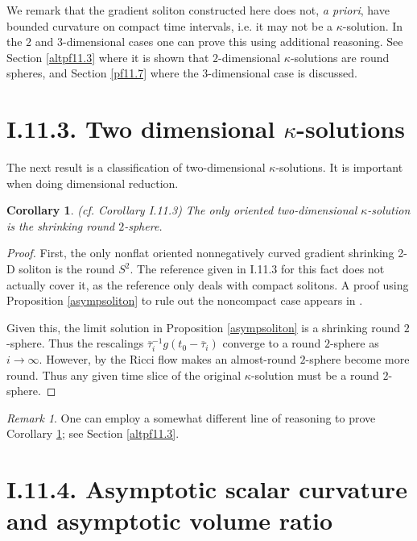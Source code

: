 \documentclass[12pt]{amsart}
\numberwithin{equation}{section}
\theoremstyle{plain}
\newtheorem{corollary}[equation]{Corollary}
\theoremstyle{definition}
\theoremstyle{remark}
\newtheorem{remark}[equation]{Remark}
\begin{document}
We remark that the gradient soliton constructed here does
not, {\it a priori}, have bounded curvature on 
compact time intervals,
i.e.
it may not be a $\kappa$-solution.  In the $2$ and
$3$-dimensional cases
one can prove this using additional
reasoning.  See Section \ref{altpf11.3} where
it is shown that $2$-dimensional $\kappa$-solutions are
round spheres, and Section \ref{pf11.7} where the $3$-dimensional
case is discussed. 


\section{I.11.3. Two dimensional $\kappa$-solutions} \label{I.11.3}

The next result is a classification of two-dimensional
$\kappa$-solutions.  It is important when doing dimensional
reduction.

\begin{corollary} (cf. Corollary I.11.3) \label{2Dsoliton}
The only oriented two-dimensional $\kappa$-solution is
the shrinking round $2$-sphere.
\end{corollary}
\begin{proof}
First, the
only nonflat oriented 
nonnegatively curved gradient shrinking 2-D soliton is the
round $S^2$. The reference \cite{Hamsurface} given in I.11.3 for this
fact does not actually cover it, as the reference
only deals with compact solitons. A proof using 
Proposition \ref{asympsoliton} to rule
out the noncompact case appears in \cite{Ye2}.

Given this, the limit solution in Proposition \ref{asympsoliton}
is a shrinking round $2$-sphere.  Thus the rescalings 
$\overline{\tau}_i^{-1} g(t_0 - \overline{\tau}_i)$ converge to
a round $2$-sphere as $i \rightarrow \infty$.  However, by \cite{Hamsurface}
the Ricci flow makes an
almost-round $2$-sphere become more round. Thus any given time slice
of the original $\kappa$-solution must be a round $2$-sphere. 
\end{proof}

\begin{remark}
One can employ a somewhat different
line of reasoning to prove Corollary \ref{2Dsoliton}; see Section
\ref{altpf11.3}.
\end{remark}

\section{I.11.4. Asymptotic scalar curvature and asymptotic volume ratio} 
\label{11.4proof}
\end{document}
